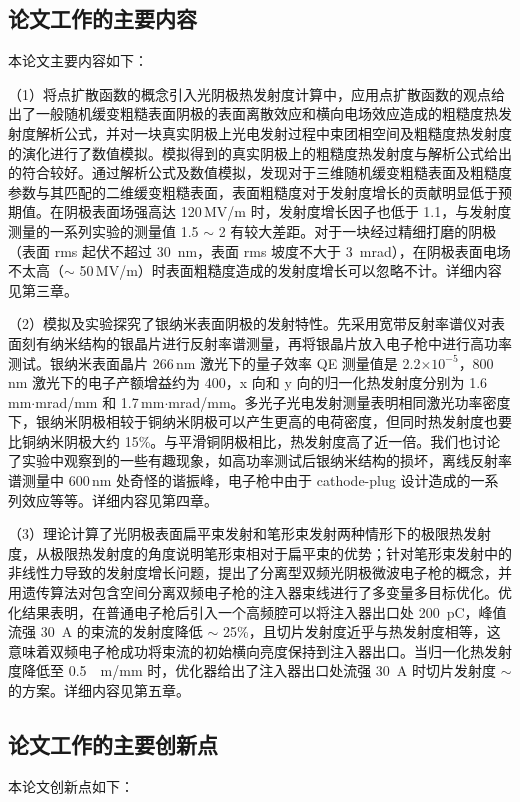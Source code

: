 \subsection{论文工作的主要内容}
本论文主要内容如下：

（1）将点扩散函数的概念引入光阴极热发射度计算中，应用点扩散函数的观点给出了一般随机缓变粗糙表面阴极的表面离散效应和横向电场效应造成的粗糙度热发射度解析公式，并对一块真实阴极上光电发射过程中束团相空间及粗糙度热发射度的演化进行了数值模拟。模拟得到的真实阴极上的粗糙度热发射度与解析公式给出的符合较好。通过解析公式及数值模拟，发现对于三维随机缓变粗糙表面及粗糙度参数与其匹配的二维缓变粗糙表面，表面粗糙度对于发射度增长的贡献明显低于预期值。在阴极表面场强高达 120\,MV/m 时，发射度增长因子也低于 1.1，与发射度测量的一系列实验的测量值 1.5 $\sim$ 2 有较大差距。对于一块经过精细打磨的阴极（表面 rms 起伏不超过 \SI{30}{nm}，表面 rms 坡度不大于 \SI{3}{mrad}），在阴极表面电场不太高（$\sim$ 50\,MV/m）时表面粗糙度造成的发射度增长可以忽略不计。详细内容见第三章。

（2）模拟及实验探究了银纳米表面阴极的发射特性。先采用宽带反射率谱仪对表面刻有纳米结构的银晶片进行反射率谱测量，再将银晶片放入电子枪中进行高功率测试。银纳米表面晶片 266\,nm 激光下的量子效率 QE 测量值是 2.2$\times10^{-5}$，800\,nm 激光下的电子产额增益约为 400，x 向和 y 向的归一化热发射度分别为 1.6\,mm$\cdot$mrad/mm 和 1.7\,mm$\cdot$mrad/mm。多光子光电发射测量表明相同激光功率密度下，银纳米阴极相较于铜纳米阴极可以产生更高的电荷密度，但同时热发射度也要比铜纳米阴极大约 15\%。与平滑铜阴极相比，热发射度高了近一倍。我们也讨论了实验中观察到的一些有趣现象，如高功率测试后银纳米结构的损坏，离线反射率谱测量中 600\,nm 处奇怪的谐振峰，电子枪中由于 cathode-plug 设计造成的一系列效应等等。详细内容见第四章。

（3）理论计算了光阴极表面扁平束发射和笔形束发射两种情形下的极限热发射度，从极限热发射度的角度说明笔形束相对于扁平束的优势；针对笔形束发射中的非线性力导致的发射度增长问题，提出了分离型双频光阴极微波电子枪的概念，并用遗传算法对包含空间分离双频电子枪的注入器束线进行了多变量多目标优化。优化结果表明，在普通电子枪后引入一个高频腔可以将注入器出口处 \SI{200}{pC}，峰值流强 \SI{30}{A} 的束流的发射度降低 $\sim$ 25\%，且切片发射度近乎与热发射度相等，这意味着双频电子枪成功将束流的初始横向亮度保持到注入器出口。当归一化热发射度降低至 \SI{0.5}{\mu m/mm} 时，优化器给出了注入器出口处流强 \SI{30}{A} 时切片发射度 $\sim$  的方案。详细内容见第五章。

\subsection{论文工作的主要创新点}
本论文创新点如下：

